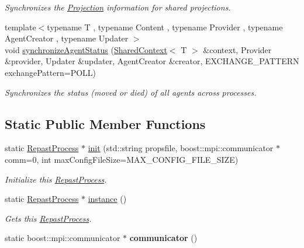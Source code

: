 \begin{DoxyCompactItemize}
\begin{DoxyCompactList}\small\item\em Synchronizes the \hyperlink{classrepast_1_1_projection}{Projection} information for shared projections. \end{DoxyCompactList}\item 
{\footnotesize template$<$typename T , typename Content , typename Provider , typename Agent\-Creator , typename Updater $>$ }\\void \hyperlink{classrepast_1_1_repast_process_a243aed166431493c78de8f1f98713743}{synchronize\-Agent\-Status} (\hyperlink{classrepast_1_1_shared_context}{Shared\-Context}$<$ T $>$ \&context, Provider \&provider, Updater \&updater, Agent\-Creator \&creator, E\-X\-C\-H\-A\-N\-G\-E\-\_\-\-P\-A\-T\-T\-E\-R\-N exchange\-Pattern=P\-O\-L\-L)
\begin{DoxyCompactList}\small\item\em Synchronizes the status (moved or died) of all agents across processes. \end{DoxyCompactList}\end{DoxyCompactItemize}
\subsection*{Static Public Member Functions}
\begin{DoxyCompactItemize}
\item 
static \hyperlink{classrepast_1_1_repast_process}{Repast\-Process} $\ast$ \hyperlink{classrepast_1_1_repast_process_a157a6c1057a1b2fa1d37b8391509611c}{init} (std\-::string propsfile, boost\-::mpi\-::communicator $\ast$comm=0, int max\-Config\-File\-Size=M\-A\-X\-\_\-\-C\-O\-N\-F\-I\-G\-\_\-\-F\-I\-L\-E\-\_\-\-S\-I\-Z\-E)
\begin{DoxyCompactList}\small\item\em Initialize this \hyperlink{classrepast_1_1_repast_process}{Repast\-Process}. \end{DoxyCompactList}\item 
static \hyperlink{classrepast_1_1_repast_process}{Repast\-Process} $\ast$ \hyperlink{classrepast_1_1_repast_process_a8eed21e917ec5d66a11cde664938e92f}{instance} ()
\begin{DoxyCompactList}\small\item\em Gets this \hyperlink{classrepast_1_1_repast_process}{Repast\-Process}. \end{DoxyCompactList}\item 
\hypertarget{classrepast_1_1_repast_process_a117dc528a5c1798163afab08dfdbe335}{static boost\-::mpi\-::communicator $\ast$ {\bfseries communicator} ()}\label{classrepast_1_1_repast_process_a117dc528a5c1798163afab08dfdbe335}

\end{DoxyCompactItemize}
